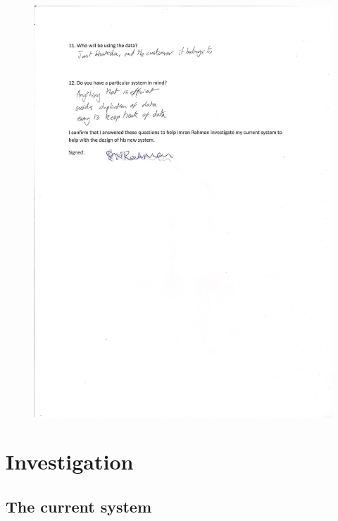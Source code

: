 \begin{figure}[H]
    \includegraphics[width=\textwidth]{./Analysis/Interview Questions 2.jpg}
\end{figure}

\section{Investigation}

\subsection{The current system}

